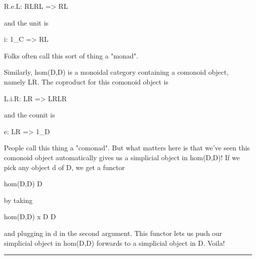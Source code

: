 R.e.L: RLRL => RL

and the unit is

i: 1_{C} => RL

Folks often call this sort of thing a "monad".  

Similarly, hom(D,D) is a monoidal category containing a comonoid object,
namely LR.  The coproduct for this comonoid object is

L.i.R: LR => LRLR

and the counit is

e: LR => 1_{D}

People call this thing a "comonad".  But what matters here is that we've
seen this comonoid object automatically gives us a simplicial object in
hom(D,D)!  If we pick any object d of D, we get a functor

hom(D,D) \to  D

by taking 

hom(D,D) x D \to  D

and plugging in d in the second argument.  This functor lets us push our
simplicial object in hom(D,D) forwards to a simplicial object in D.
Voila!













 \par\noindent\rule{\textwidth}{0.4pt}

